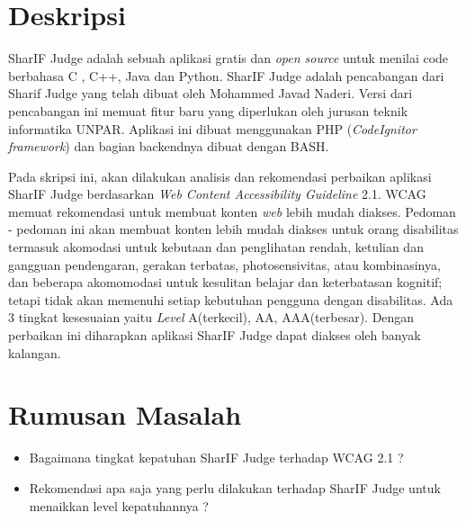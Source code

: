 \documentclass[a4paper,twoside]{article}
\begin{document}
\title{\@judultopik}
\author{\nama \textendash \@npm} 

\newcommand{\nama}{Amabel Levint}
\newcommand{\@npm}{2016730013}
\newcommand{\@judultopik}{Kepatuhan dan Rekomendasi Perbaikan Web Content Accessibility Guideline 2.1 untuk Aplikasi SharIF Judge} %
\newcommand{\jumpemb}{1} %
\newcommand{\tanggal}{23/08/2019}


\maketitle


\section{Deskripsi}
SharIF Judge adalah sebuah aplikasi gratis dan \textit{open source} untuk menilai code berbahasa C , C++, Java dan Python. SharIF Judge adalah pencabangan dari Sharif Judge yang telah dibuat oleh Mohammed Javad Naderi. Versi dari pencabangan ini memuat fitur baru yang diperlukan oleh jurusan teknik informatika UNPAR. Aplikasi ini dibuat menggunakan PHP (\textit{CodeIgnitor framework}) dan bagian backendnya dibuat dengan BASH.

Pada skripsi ini, akan dilakukan analisis dan rekomendasi perbaikan aplikasi SharIF Judge berdasarkan \textit{Web Content Accessibility Guideline} 2.1. WCAG memuat rekomendasi untuk membuat konten \textit{web} lebih mudah diakses. Pedoman - pedoman ini akan membuat konten lebih mudah diakses untuk orang disabilitas termasuk akomodasi untuk kebutaan dan penglihatan rendah, ketulian dan gangguan pendengaran, gerakan terbatas, photosensivitas, atau kombinasinya, dan beberapa akomomodasi untuk kesulitan belajar dan keterbatasan kognitif; tetapi tidak akan memenuhi setiap kebutuhan pengguna dengan disabilitas. Ada 3 tingkat kesesuaian yaitu \textit{Level} A(terkecil), AA, AAA(terbesar). Dengan perbaikan ini diharapkan aplikasi SharIF Judge dapat diakses oleh banyak kalangan.

\section{Rumusan Masalah}
\begin{itemize}
	\item Bagaimana tingkat kepatuhan SharIF Judge terhadap WCAG 2.1 ?
	\item Rekomendasi apa saja yang perlu dilakukan terhadap SharIF Judge untuk menaikkan level kepatuhannya ?
\end{itemize}
\end{document}
